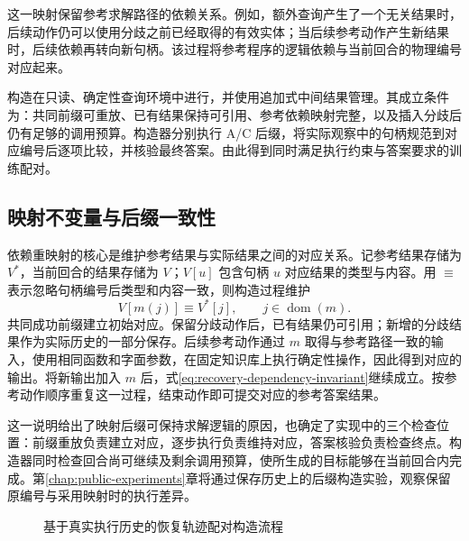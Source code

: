 这一映射保留参考求解路径的依赖关系。例如，额外查询产生了一个无关结果时，后续动作仍可以使用分歧之前已经取得的有效实体；当后续参考动作产生新结果时，后续依赖再转向新句柄。该过程将参考程序的逻辑依赖与当前回合的物理编号对应起来。

构造在只读、确定性查询环境中进行，并使用追加式中间结果管理。其成立条件为：共同前缀可重放、已有结果保持可引用、参考依赖映射完整，以及插入分歧后仍有足够的调用预算。构造器分别执行 A/C 后缀，将实际观察中的句柄规范到对应编号后逐项比较，并核验最终答案。由此得到同时满足执行约束与答案要求的训练配对。

\subsection{映射不变量与后缀一致性}

依赖重映射的核心是维护参考结果与实际结果之间的对应关系。记参考结果存储为 $V^*$，当前回合的结果存储为 $V$；$V[u]$ 包含句柄 $u$ 对应结果的类型与内容。用 $\equiv$ 表示忽略句柄编号后类型和内容一致，则构造过程维护
\begin{equation}
  V[m(j)]\equiv V^*[j],\qquad j\in\operatorname{dom}(m).
  \label{eq:recovery-dependency-invariant}
\end{equation}
共同成功前缀建立初始对应。保留分歧动作后，已有结果仍可引用；新增的分歧结果作为实际历史的一部分保存。后续参考动作通过 $m$ 取得与参考路径一致的输入，使用相同函数和字面参数，在固定知识库上执行确定性操作，因此得到对应的输出。将新输出加入 $m$ 后，式\eqref{eq:recovery-dependency-invariant}继续成立。按参考动作顺序重复这一过程，结束动作即可提交对应的参考答案结果。

这一说明给出了映射后缀可保持求解逻辑的原因，也确定了实现中的三个检查位置：前缀重放负责建立对应，逐步执行负责维持对应，答案核验负责检查终点。构造器同时检查回合尚可继续及剩余调用预算，使所生成的目标能够在当前回合内完成。第\ref{chap:public-experiments}章将通过保存历史上的后缀构造实验，观察保留原编号与采用映射时的执行差异。

\begin{figure}[htbp]
\centering
{}
\caption{基于真实执行历史的恢复轨迹配对构造流程}
\label{fig:recovery-construction}
\end{figure}

